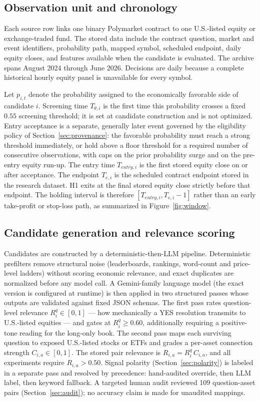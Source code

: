 \documentclass[sigconf,anonymous]{acmart}
\begin{document}
\subsection{Observation unit and chronology}

Each source row links one binary Polymarket contract to one U.S.-listed equity or exchange-traded fund. The stored data include the contract question, market and event identifiers, probability path, mapped symbol, scheduled endpoint, daily equity closes, and features available when the candidate is evaluated. The archive spans August 2024 through June 2026. Decisions are daily because a complete historical hourly equity panel is unavailable for every symbol.

Let $p_{i,t}$ denote the probability assigned to the economically favorable side of candidate $i$. Screening time $T_{\theta,i}$ is the first time this probability crosses a fixed $0.55$ screening threshold; it is set at candidate construction and is not optimized. Entry acceptance is a separate, generally later event governed by the eligibility policy of Section~\ref{sec:provenance}: the favorable probability must reach a strong threshold immediately, or hold above a floor threshold for a required number of consecutive observations, with caps on the prior probability surge and on the pre-entry equity run-up. The entry time $T_{entry,i}$ is the first stored equity close on or after acceptance. The endpoint $T_{e,i}$ is the scheduled contract endpoint stored in the research dataset. H1 exits at the final stored equity close strictly before that endpoint. The holding interval is therefore $[T_{entry,i},T_{e,i}-1]$ rather than an early take-profit or stop-loss path, as summarized in Figure~\ref{fig:window}.

\subsection{Candidate generation and relevance scoring}
\label{sec:gemini}

Candidates are constructed by a deterministic-then-LLM pipeline. Deterministic prefilters remove structural noise (leaderboards, rankings, word-count and price-level ladders) without scoring economic relevance, and exact duplicates are normalized before any model call. A Gemini-family language model (the exact version is configured at runtime) is then applied in two structured passes whose outputs are validated against fixed JSON schemas. The first pass rates question-level relevance $R^q_i\in[0,1]$ --- how mechanically a YES resolution transmits to U.S.-listed equities --- and gates at $R^q_i\ge 0.60$, additionally requiring a positive-tone reading for the long-only book. The second pass maps each surviving question to exposed U.S.-listed stocks or ETFs and grades a per-asset connection strength $C_{i,a}\in[0,1]$. The stored pair relevance is $R_{i,a}=R^q_i\,C_{i,a}$, and all experiments require $R_{i,a}>0.50$. Signal polarity (Section~\ref{sec:polarity}) is labeled in a separate pass and resolved by precedence: hand-audited override, then LLM label, then keyword fallback. A targeted human audit reviewed 109 question-asset pairs (Section~\ref{sec:audit}); no accuracy claim is made for unaudited mappings.
\end{document}
